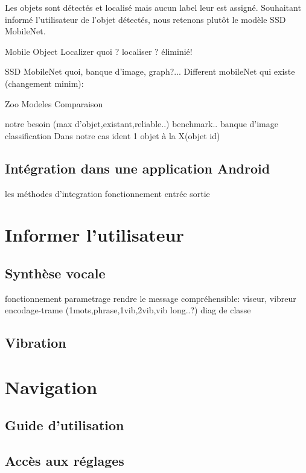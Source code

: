 \documentclass[UTF8]{EPURapport}
\begin{document}
Les objets sont détectés et localisé mais aucun label leur est assigné. Souhaitant informé l'utilisateur de l'objet détectés, nous retenons plutôt le modèle SSD MobileNet.

Mobile Object Localizer
quoi ? localiser ? éliminié!

SSD MobileNet
quoi, banque d'image, graph?...
Different mobileNet qui existe (changement minim): %

Zoo Modeles Comparaison


notre besoin (max d'objet,existant,reliable..)
benchmark..
banque d'image
classification
Dans notre cas 
ident 1 objet à la X(objet id)
\subsection{Intégration dans une application Android}
les méthodes d'integration
fonctionnement
entrée sortie

\section{Informer l'utilisateur}
\subsection{Synthèse vocale}
fonctionnement
parametrage
rendre le message compréhensible: viseur,
vibreur
encodage-trame (1mots,phrase,1vib,2vib,vib long..?)
diag de classe

\subsection{Vibration}

\section{Navigation}
\subsection{Guide d'utilisation}
\subsection{Accès aux réglages}

\annexes
\end{document}
